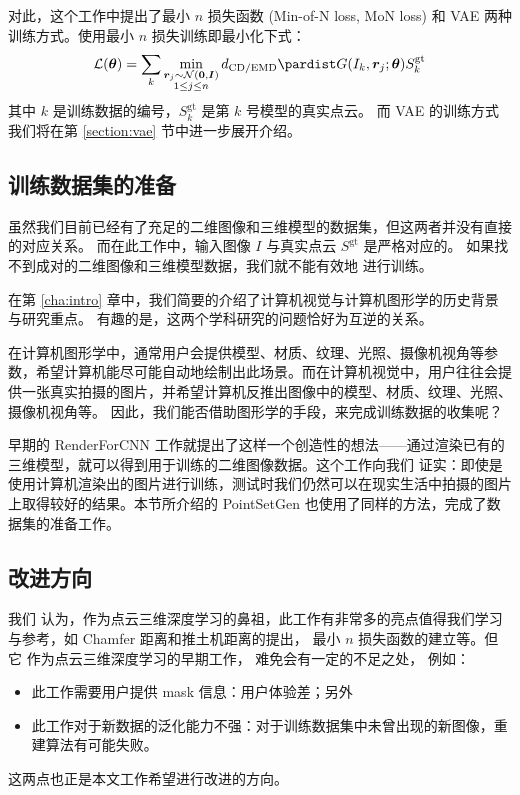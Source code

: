 对此，这个工作中提出了最小 $n$ 损失函数 (Min-of-N loss, MoN loss) 和 VAE 两种训练方式。使用最小 $n$ 损失训练即最小化下式：
\begin{align}
	\Loss(\bm \theta) = \sum_k
	\min_{\substack{\bm r_j \sim \NormDist(\bm 0, \bm I) \\  1 \le j \le n}}
	\DCDEMD{    G(I_k, \bm r_j; \bm \theta)    }{   S_k^{\text{gt}}   }
\end{align}
其中 $k$ 是训练数据的编号，$S_k^{\text{gt}}$ 是第 $k$ 号模型的真实点云。
而 VAE 的训练方式我们将在第 \ref{section:vae} 节中进一步展开介绍。

\subsection{训练数据集的准备 \label{section:pointsetgenpre}}
虽然我们目前已经有了充足的二维图像\cite{imagenet}和三维模型\cite{shapenet}的数据集，但这两者并没有直接的对应关系。
而在此工作中，输入图像 $I$ 与真实点云 $S^{\text{gt}}$ 是严格对应的。
如果找不到成对的二维图像和三维模型数据，我们就不能有效地%
进行训练。

在第 \ref{cha:intro} 章中，我们简要的介绍了计算机视觉与计算机图形学的历史背景与研究重点。
有趣的是，这两个学科研究的问题恰好为互逆的关系。

在计算机图形学中，通常用户会提供模型、材质、纹理、光照、摄像机视角等参数，希望计算机能尽可能自动地绘制出此场景。而在计算机视觉中，用户往往会提供一张真实拍摄的图片，并希望计算机反推出图像中的模型、材质、纹理、光照、摄像机视角等。
因此，我们能否借助图形学的手段，来完成训练数据的收集呢？

早期的 RenderForCNN \cite{rendercnn} 工作就提出了这样一个创造性的想法——通过渲染已有的三维模型，就可以得到用于训练的二维图像数据。这个工作向我们
证实：即使是使用计算机渲染出的图片进行训练，测试时我们仍然可以在现实生活中拍摄的图片上取得较好的结果。本节所介绍的 PointSetGen 也使用了同样的方法，完成了数据集的准备工作。


\subsection{改进方向}
我们
认为，作为点云三维深度学习的鼻祖，此工作有非常多的亮点值得我们学习与参考，如 Chamfer 距离和推土机距离的提出，
最小 $n$ 损失函数的建立等。但
它
作为点云三维深度学习的早期工作，%
难免会有一定的不足之处，
例如：
\begin{itemize}
	\item 此工作需要用户提供 mask 信息：用户体验差；另外
	\item 此工作对于新数据的泛化能力不强：对于训练数据集中未曾出现的新图像，重建算法有可能失败。
\end{itemize}
这两点也正是本文工作希望进行改进的方向。


